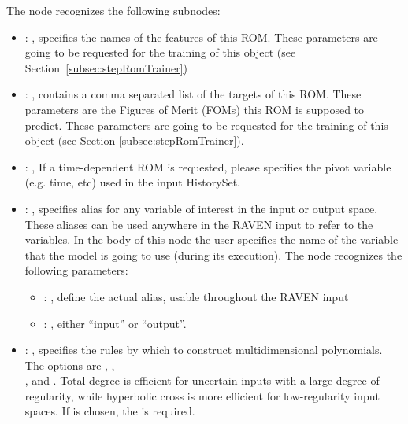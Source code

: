   The  node recognizes the following subnodes:
  \begin{itemize}
    \item {}: , 
      specifies the names of the features of this ROM.         \nb These parameters are going to be
      requested for the training of this object         (see Section~\ref{subsec:stepRomTrainer})

    \item {}: , 
      contains a comma separated list of the targets of this ROM. These parameters         are the
      Figures of Merit (FOMs) this ROM is supposed to predict.         \nb These parameters are
      going to be requested for the training of this         object (see Section
      \ref{subsec:stepRomTrainer}).

    \item {}: , 
      If a time-dependent ROM is requested, please specifies the pivot         variable (e.g. time,
      etc) used in the input HistorySet.

    \item {}: , 
      specifies alias for         any variable of interest in the input or output space. These
      aliases can be used anywhere in the RAVEN input to         refer to the variables. In the body
      of this node the user specifies the name of the variable that the model is going to use
      (during its execution).
      The  node recognizes the following parameters:
        \begin{itemize}
          \item {}: , 
            define the actual alias, usable throughout the RAVEN input
          \item {}: , 
            either ``input'' or ``output''.
      \end{itemize}

    \item {}: , 
      specifies the rules by which to construct multidimensional polynomials.  The options are
      , ,\\
      , and .
      Total degree is efficient for                                                  uncertain
      inputs with a large degree of regularity, while hyperbolic cross is more efficient
      for low-regularity input spaces.                                                  If
       is chosen, the  is required.


\end{itemize}
